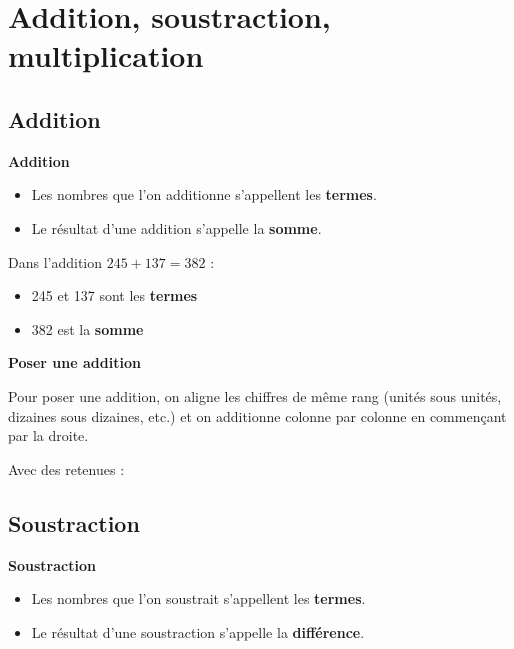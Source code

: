 \section{Addition, soustraction, multiplication}

\subsection{Addition}

\begin{definitionbox}
	\textbf{Addition}
	\begin{itemize}[label = \textbullet]
		\item Les nombres que l'on additionne s'appellent les \textbf{termes}.
		\item Le résultat d'une addition s'appelle la \textbf{somme}.
	\end{itemize}
\end{definitionbox}

\begin{examplebox}
	Dans l'addition $245 + 137 = 382$ :
	\begin{itemize}[label = \textbullet]
		\item 245 et 137 sont les \textbf{termes}
		\item 382 est la \textbf{somme}
	\end{itemize}
\end{examplebox}

\begin{methodebox}
	\textbf{Poser une addition}
	
	Pour poser une addition, on aligne les chiffres de même rang (unités sous unités, dizaines sous dizaines, etc.) et on additionne colonne par colonne en commençant par la droite.
	
	\begin{center}
	\end{center}
	
	Avec des retenues :
	\begin{center}
	\end{center}
\end{methodebox}

\subsection{Soustraction}

\begin{definitionbox}
	\textbf{Soustraction}
	\begin{itemize}[label = \textbullet]
		\item Les nombres que l'on soustrait s'appellent les \textbf{termes}.
		\item Le résultat d'une soustraction s'appelle la \textbf{différence}.
	\end{itemize}
\end{definitionbox}

